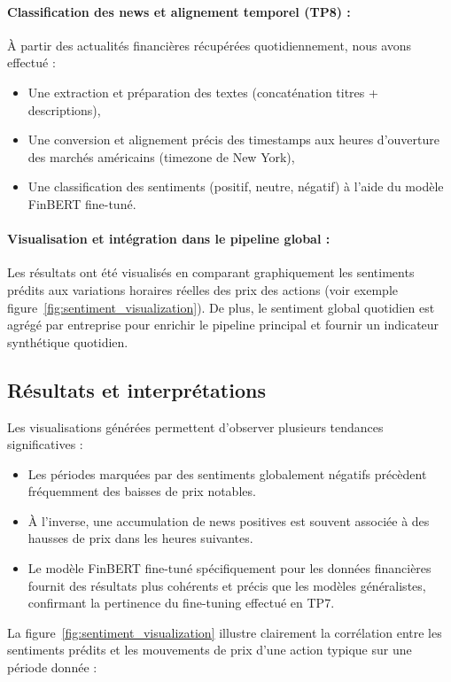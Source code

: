 \documentclass[a4paper,12pt]{article}
\begin{document}
\paragraph{Classification des news et alignement temporel (TP8) :}  
À partir des actualités financières récupérées quotidiennement, nous avons effectué :
\begin{itemize}
    \item Une extraction et préparation des textes (concaténation titres + descriptions),
    \item Une conversion et alignement précis des timestamps aux heures d’ouverture des marchés américains (timezone de New York),
    \item Une classification des sentiments (positif, neutre, négatif) à l’aide du modèle FinBERT fine-tuné.
\end{itemize}

\paragraph{Visualisation et intégration dans le pipeline global :}  
Les résultats ont été visualisés en comparant graphiquement les sentiments prédits aux variations horaires réelles des prix des actions (voir exemple figure~\ref{fig:sentiment_visualization}). De plus, le sentiment global quotidien est agrégé par entreprise pour enrichir le pipeline principal et fournir un indicateur synthétique quotidien.

\subsection*{Résultats et interprétations}

Les visualisations générées permettent d’observer plusieurs tendances significatives :
\begin{itemize}
    \item Les périodes marquées par des sentiments globalement négatifs précèdent fréquemment des baisses de prix notables.
    \item À l’inverse, une accumulation de news positives est souvent associée à des hausses de prix dans les heures suivantes.
    \item Le modèle FinBERT fine-tuné spécifiquement pour les données financières fournit des résultats plus cohérents et précis que les modèles généralistes, confirmant la pertinence du fine-tuning effectué en TP7.
\end{itemize}

La figure~\ref{fig:sentiment_visualization} illustre clairement la corrélation entre les sentiments prédits et les mouvements de prix d'une action typique sur une période donnée :
\end{document}
